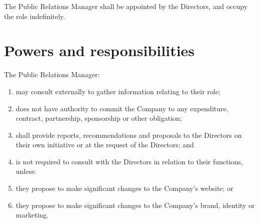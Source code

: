 \documentclass[a4paper,10pt]{article}
\renewcommand{\labelenumi}{(\arabic{enumi})}
\begin{document}
The Public Relations Manager shall be appointed by the Directors, and occupy the role indefinitely.

\section{Powers and responsibilities}

The Public Relations Manager:

\begin{enumerate}
    \renewcommand{\labelenumi}{(\alph{enumi})}
    \item may consult externally to gather information relating to their role;
    \item does not have authority to commit the Company to any expenditure, contract, partnership, sponsorship or other obligation;
    \item shall provide reports, recommendations and proposals to the Directors on their own initiative or at the request of the Directors; and
    \item is not required to consult with the Directors in relation to their functions, unless:
    \item they propose to make significant changes to the Company’s website; or
    \item they propose to make significant changes to the Company’s brand, identity or marketing.
\end{enumerate}
\end{document}
